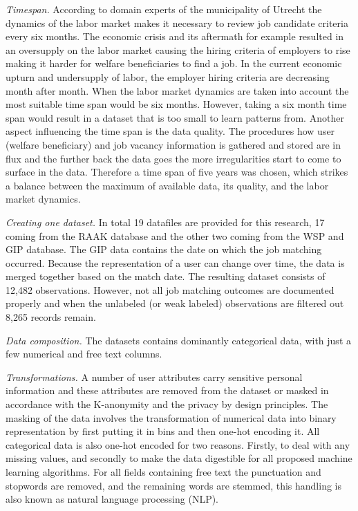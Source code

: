 \textit{Timespan.}
According to domain experts of the municipality of Utrecht the dynamics of the labor market makes it necessary to review job candidate criteria every six months.
The economic crisis and its aftermath for example resulted in an oversupply on the labor market causing the hiring criteria of employers to rise making it harder for welfare beneficiaries to find a job.
In the current economic upturn and undersupply of labor, the employer hiring criteria are decreasing month after month. 
When the labor market dynamics are taken into account the most suitable time span would be six months.
However, taking a six month time span would result in a dataset that is too small to learn patterns from.
Another aspect influencing the time span is the data quality.
The procedures how user (welfare beneficiary) and job vacancy information is gathered and stored are in flux and the further back the data goes the more irregularities start to come to surface in the data.
Therefore a time span of five years was chosen, which strikes a balance between the maximum of available data, its quality, and the labor market dynamics.

\textit{Creating one dataset.}
In total 19 datafiles are provided for this research, 17 coming from the RAAK database and the other two coming from the WSP and GIP database.
The GIP data contains the date on which the job matching occurred. 
Because the representation of a user can change over time, the data is merged together based on the match date. 
The resulting dataset consists of 12,482 observations.
However, not all job matching outcomes are documented properly and when the unlabeled (or weak labeled) observations are filtered out 8,265 records remain.

\textit{Data composition.} 
The datasets contains dominantly categorical data, with just a few numerical and free text columns.

\textit{Transformations.}
A number of user attributes carry sensitive personal information and these attributes are removed from the dataset or masked in accordance with the K-anonymity \cite{sweeney2002k} and the privacy by design \cite{d2015privacy} principles.
The masking of the data involves the transformation of numerical data into binary representation by first putting it in bins and then one-hot encoding it. 
All categorical data is also one-hot encoded for two reasons. 
Firstly, to deal with any missing values, and secondly to make the data digestible for all proposed machine learning algorithms. 
For all fields containing free text the punctuation and stopwords are removed, and the remaining words are stemmed, this handling is also known as natural language processing (NLP).

